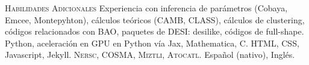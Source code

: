 \begin{rubric}{\faTools \textsc{Habilidades Adicionales}}
	Experiencia con inferencia de parámetros (Cobaya, Emcee, Montepyhton), cálculos teóricos (CAMB, CLASS), cálculos de clustering, códigos relacionados con BAO, paquetes de DESI: desilike, códigos de full-shape.
\entry*[Programación]
	Python, aceleración en GPU en Python vía Jax, Mathematica, C.
	HTML, CSS, Javascript, Jekyll.
\entry*[Supercomputador]
	\textsc{Nersc, COSMA, Miztli, Atocatl.}
\entry*[Idiomas]
	Español (nativo), Inglés.
\end{rubric}
